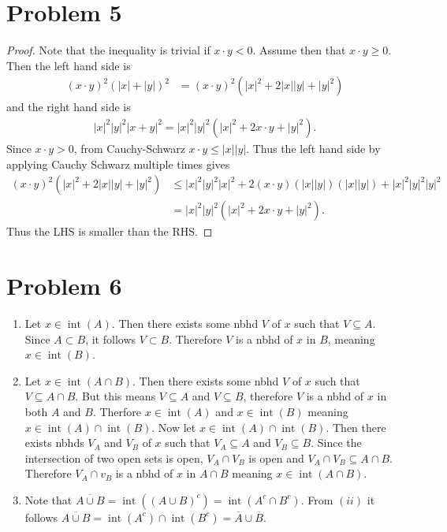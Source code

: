 \documentclass{eeleyes}
\newcommand\conj[1]{\overline{#1}}
\DeclareMathOperator{\interior}{int}
\begin{document}
\section*{Problem 5}
\begin{proof}
    Note that the inequality is trivial if $x \cdot y < 0$. Assume then that $x \cdot y \geq 0$. Then the left hand side is
    \begin{align*}
        (x \cdot y)^2 (|x| + |y|)^2 &= (x \cdot y)^2 (|x|^2 + 2|x||y| + |y|^2)
    \end{align*}
    and the right hand side is
    \begin{align*}
        |x|^2 |y|^2 |x + y|^2 = |x|^2 |y|^2 (|x|^2 + 2 x\cdot y + |y|^2).
    \end{align*}
    Since $x \cdot y > 0$, from Cauchy-Schwarz $x \cdot y \leq |x| |y|$. Thus the left hand side by applying Cauchy Schwarz multiple times gives
    \begin{align*}
        (x \cdot y)^2 (|x|^2 + 2|x||y| + |y|^2) &\leq |x|^2 |y|^2 |x|^2 + 2 (x \cdot y)(|x| |y|)(|x||y|) + |x|^2 |y|^2 |y|^2 \\
        &= |x|^2 |y|^2 (|x|^2 + 2 x \cdot y + |y|^2).
    \end{align*}
    Thus the LHS is smaller than the RHS.
\end{proof}

\section*{Problem 6}
\begin{enumerate}[label=\roman*)]
    \item Let $x \in \interior(A)$. Then there exists some nbhd $V$ of $x$ such that $V \subseteq A$. Since $A \subset B$, it follows $V \subset B$. Therefore $V$ is a nbhd of $x$ in $B$, meaning $x \in \interior(B)$.
    \item Let $x \in \interior(A \cap B)$. Then there exists some nbhd $V$ of $x$ such that $V \subseteq A \cap B$. But this means $V \subseteq A$ and $V \subseteq B$, therefore $V$ is a nbhd of $x$ in both $A$ and $B$. Therfore $x \in \interior(A)$ and $x \in \interior(B)$ meaning $x \in \interior(A) \cap \interior(B)$. Now let $x \in \interior(A) \cap \interior(B)$. Then there exists nbhds $V_A$ and $V_B$ of $x$ such that $V_A \subseteq A$ and $V_B \subseteq B$. Since the intersection of two open sets is open, $V_A \cap V_B$ is open and $V_A \cap V_B \subseteq A \cap B$. Therefore $V_A \cap v_B$ is a nbhd of $x$ in $A \cap B$ meaning $x \in \interior(A \cap B)$.

    \item Note that $\conj{A \cup B} = \interior((A \cup B)^c) = \interior(A^c \cap B^c)$. From $(ii)$ it follows $\conj{A \cup B} = \interior(A^c) \cap \interior(B^c) = \conj{A} \cup \conj{B}$.
\end{enumerate}
\end{document}
